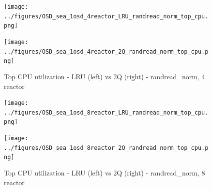 \begin{figure}[!ht]
  \centering
  \begin{minipage}{.5\textwidth}
  \centering
    \texttt{[image: ../figures/OSD\_sea\_1osd\_4reactor\_LRU\_randread\_norm\_top\_cpu.png]}
  \end{minipage}%
  \begin{minipage}{.5\textwidth}
  \centering
    \texttt{[image: ../figures/OSD\_sea\_1osd\_4reactor\_2Q\_randread\_norm\_top\_cpu.png]}
  \end{minipage}%
  \caption{Top CPU utilization - LRU (left) vs 2Q (right) - randread\_norm, 4 reactor}
  \label{figure:4-reactor-cpu-randread_norm}
\end{figure}


\begin{figure}[!ht]
  \centering
  \begin{minipage}{.5\textwidth}
  \centering
    \texttt{[image: ../figures/OSD\_sea\_1osd\_8reactor\_LRU\_randread\_norm\_top\_cpu.png]}
  \end{minipage}%
  \begin{minipage}{.5\textwidth}
  \centering
    \texttt{[image: ../figures/OSD\_sea\_1osd\_8reactor\_2Q\_randread\_norm\_top\_cpu.png]}
  \end{minipage}%
  \caption{Top CPU utilization - LRU (left) vs 2Q (right) - randread\_norm, 8 reactor}
  \label{figure:8-reactor-cpu-randread_norm}
\end{figure}

